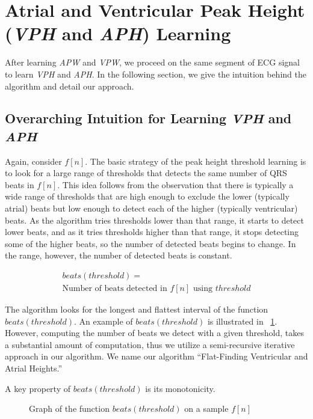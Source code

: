 \documentclass[conference]{IEEEtran}
\newcommand{\APW}{\textit{APW}}
\newcommand{\VPW}{\textit{VPW}}
\newcommand{\APH}{\textit{APH}}
\newcommand{\VPH}{\textit{VPH}}
\begin{document}
\section{Atrial and Ventricular Peak Height (\VPH{} and \APH{}) Learning}
After learning \APW{} and \VPW{}, we proceed on the
same segment of ECG signal to learn \VPH{} and \APH{}. In
the following section, we give the intuition behind the
algorithm and detail our approach.

\subsection{Overarching Intuition for Learning \VPH{} and \APH{}}
Again, consider $f[n]$. The basic strategy of the peak
height threshold learning is to look for a large range of
thresholds that detects the same number of QRS beats in
$f[n]$. This idea follows from the observation that there
is typically a wide range of thresholds that are high
enough to exclude the lower (typically atrial) beats but
low enough to detect each of the higher (typically
ventricular) beats. As the algorithm tries thresholds
lower than that range, it starts to detect lower beats, and
as it tries thresholds higher than that range, it stops
detecting some of the higher beats, so the number of
detected beats begins to change. In the range, however,
the number of detected beats is constant.

\begin{multline}
	beats(threshold) = \\\text{Number of beats detected in } f[n] \text{ using } threshold
\end{multline}

The algorithm looks for the longest and flattest
interval of the function $beats(threshold)$. An example of
$beats(threshold)$ is illustrated in \figurename~\ref{fig:beats}.
However, computing the number of beats we detect with a given
threshold, takes a substantial amount of computation,
thus we utilize a semi-recursive iterative approach in our
algorithm. We name our algorithm ``Flat-Finding
Ventricular and Atrial Heights.''

A key property of $beats(threshold)$ is its monotonicity. 

\begin{figure}
	\centering
	\caption{Graph of the function $beats(threshold)$ on a sample $f[n]$}
	\label{fig:beats}
\end{figure}
\end{document}
